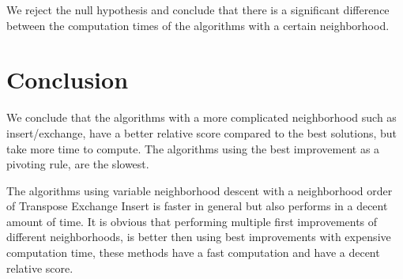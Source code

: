 \documentclass[]{article}
\begin{document}
	We reject the null hypothesis and conclude that there is a significant difference between the computation times of the algorithms with a certain neighborhood.
	
	
	
	\section{Conclusion}


	We conclude that the algorithms with a more complicated neighborhood such as insert/exchange, have a better relative score compared to the best solutions, but take more time to compute.
	The algorithms using the best improvement as a pivoting rule, are the slowest.
	
	The algorithms using variable neighborhood descent with a neighborhood order of Transpose Exchange Insert is faster in general but also performs in a decent amount of time.\newline
	It is obvious that performing multiple first improvements of different neighborhoods, is better then using best improvements with expensive computation time, these methods have a fast computation and have a decent relative score.
	
\end{document}
